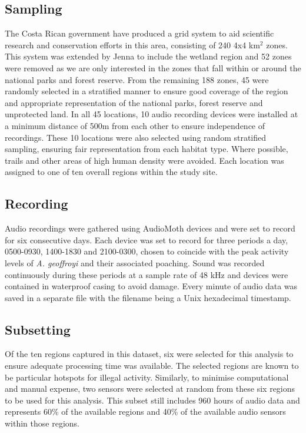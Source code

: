 \subsection{Sampling}

The Costa Rican government have produced a grid system to aid scientific research and conservation efforts in this area, consisting of 240 4x4 km$^2$ zones. This system was extended by Jenna to include the wetland region and 52 zones were removed as we are only interested in the zones that fall within or around the national parks and forest reserve. From the remaining 188 zones, 45 were randomly selected in a stratified manner to ensure good coverage of the region and appropriate representation of the national parks, forest reserve and unprotected land. In all 45 locations, 10 audio recording devices were installed at a minimum distance of 500m from each other to ensure independence of recordings. These 10 locations were also selected using random stratified sampling, ensuring fair representation from each habitat type. Where possible, trails and other areas of high human density were avoided. Each location was assigned to one of ten overall regions within the study site.

\subsection{Recording}

Audio recordings were gathered using AudioMoth devices and were set to record for six consecutive days. Each device was set to record for three periods a day, 0500-0930, 1400-1830 and 2100-0300, chosen to coincide with the peak activity levels of \textit{A. geoffroyi} and their associated poaching. Sound was recorded continuously during these periods at a sample rate of 48 kHz and devices were contained in waterproof casing to avoid damage. Every minute of audio data was saved in a separate file with the filename being a Unix hexadecimal timestamp.


\subsection{Subsetting}

Of the ten regions captured in this dataset, six were selected for this analysis to ensure adequate processing time was available. The selected regions are known to be particular hotspots for illegal activity. Similarly, to minimise computational and manual expense, two sensors were selected at random from these six regions to be used for this analysis. This subset still includes 960 hours of audio data and represents 60\% of the available regions and 40\% of the available audio sensors within those regions.


